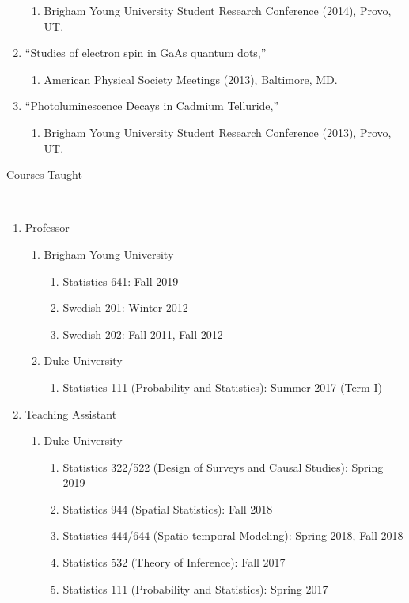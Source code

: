 \documentclass[12pt]{article}
\newcommand{\head}[1]{ %
    \bigskip %
    \begin{large}\begin{bf}{#1}\end{bf}\end{large} %

    \ \\ [-1.3cm] %

    \hrulefill}
\begin{document}
\begin{enumerate}[label=$\bullet$]
\begin{enumerate}[label=$\cdot$]
\item Brigham Young University Student Research Conference (2014), Provo, UT.
\end{enumerate}
\item  ``Studies of electron spin in GaAs quantum dots,''
\begin{enumerate}[label=$\cdot$]
\item  American Physical Society Meetings (2013), Baltimore, MD.
\end{enumerate}
\item  ``Photoluminescence Decays in Cadmium Telluride,'' 
\begin{enumerate}[label=$\cdot$]
\item Brigham Young University Student Research Conference (2013), Provo, UT.
\end{enumerate}
\end{enumerate}

\head{Courses Taught}

\begin{enumerate}[label=$\bullet$]
\item Professor
\begin{enumerate}[label=$\cdot$]
\item Brigham Young University
\begin{enumerate}[label=$\cdot$]
\item Statistics 641: Fall 2019
\item Swedish 201: Winter 2012 
\item Swedish 202: Fall 2011, Fall 2012
\end{enumerate}
\item Duke University
\begin{enumerate}[label=$\cdot$]
\item Statistics 111 (Probability and Statistics): Summer 2017 (Term I)
\end{enumerate}
\end{enumerate}
\item Teaching Assistant
\begin{enumerate}[label=$\cdot$]
\item Duke University
\begin{enumerate}[label=$\cdot$]
\item Statistics 322/522 (Design of Surveys and Causal Studies): Spring 2019
\item Statistics 944 (Spatial Statistics): Fall 2018
\item Statistics 444/644 (Spatio-temporal Modeling): Spring 2018, Fall 2018
\item Statistics 532 (Theory of Inference): Fall 2017
\item Statistics 111 (Probability and Statistics): Spring 2017 
\end{enumerate}
\end{enumerate}
\end{enumerate}
\end{document}
